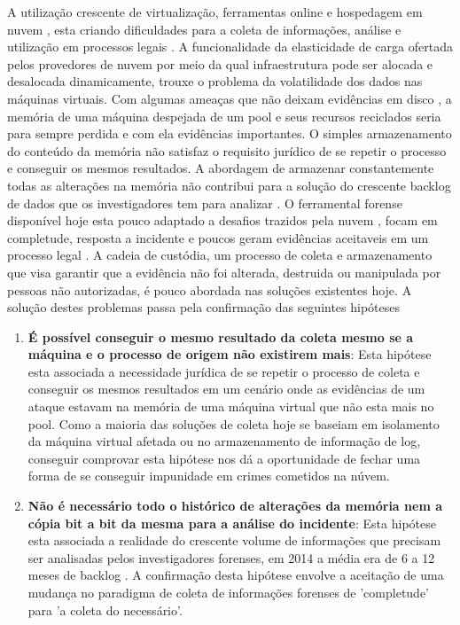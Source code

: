 \documentclass[12pt,				%
	openright,			%
	oneside,			%
	a4paper,			%
	english,			%
	brazil				%
	]{abntex2}
\begin{document}
A utilização crescente de virtualização, ferramentas online e hospedagem em nuvem \cite{Amazon2016}, esta criando dificuldades para a coleta de informações, análise e utilização 
em processos legais \cite{Sharma2012}. A funcionalidade da elasticidade de carga ofertada pelos provedores de nuvem por meio da qual infraestrutura pode ser 
alocada e desalocada dinamicamente, trouxe o problema da volatilidade dos dados nas máquinas virtuais. Com algumas ameaças que não deixam evidências em disco \cite{Rafique2013}, 
a memória de uma máquina despejada de um pool e seus recursos reciclados seria para sempre perdida e com ela evidências importantes. O simples armazenamento do conteúdo da memória
não satisfaz o requisito jurídico de se repetir o processo e conseguir os mesmos resultados. A abordagem de armazenar constantemente todas as alterações na memória não contribui 
para a solução do crescente backlog de dados que os investigadores tem para analizar \cite{Quick2014}. O ferramental forense disponível hoje esta pouco adaptado a desafios trazidos
pela nuvem \cite{Dykstra2012a}, focam em completude, resposta a incidente e poucos geram evidências aceitaveis em um processo legal \cite{Reichert2015}. A cadeia de custódia, um 
processo de coleta e armazenamento que visa garantir que a evidência não foi alterada, destruida ou manipulada por pessoas não autorizadas, é pouco abordada nas soluções existentes
hoje. A solução destes problemas passa pela confirmação das seguintes hipóteses

\begin{enumerate}
 \item \textbf{É possível conseguir o mesmo resultado da coleta mesmo se a máquina e o processo de origem não existirem mais}: Esta hipótese esta associada a necessidade jurídica de se 
 repetir o processo de coleta e conseguir os mesmos resultados em um cenário onde as evidências de um ataque estavam na memória de uma máquina virtual que não esta mais no pool.
 Como a maioria das soluções de coleta hoje se baseiam em isolamento da máquina virtual afetada ou no armazenamento de informação de log, conseguir comprovar esta hipótese nos dá
 a oportunidade de fechar uma forma de se conseguir impunidade em crimes cometidos na núvem.
 \item \textbf{Não é necessário todo o histórico de alterações da memória nem a cópia bit a bit da mesma para a análise do incidente}: Esta hipótese esta associada a realidade do crescente
 volume de informações que precisam ser analisadas pelos investigadores forenses, em 2014 a média era de 6 a 12 meses de backlog \cite{Quick2014}. A confirmação desta hipótese
 envolve a aceitação de uma mudança no paradigma de coleta de informações forenses de 'completude' para 'a coleta do necessário'.
\end{enumerate}
\end{document}
